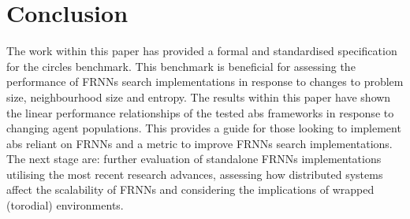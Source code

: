 \vspace{-0.3cm}
\section{Conclusion\label{sec:conclusion}}
\vspace{-0.3cm}
  The work within this paper has provided a formal and standardised specification for the circles benchmark. This benchmark is beneficial for assessing the performance of FRNNs search implementations in response to changes to problem size, neighbourhood size and entropy. The results within this paper have shown the linear performance relationships of the tested \gls{abs} frameworks in response to changing agent populations. This provides a guide for those looking to implement \gls{abs} reliant on FRNNs and a metric to improve FRNNs search implementations. The next stage are: further evaluation of standalone FRNNs implementations utilising the most recent research advances, assessing how distributed systems affect the scalability of FRNNs and considering the implications of wrapped (torodial) environments.